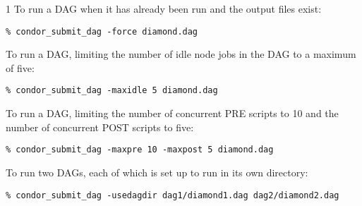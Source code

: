\begin{ManPage}{\label{man-condor-submit-dag}}{1}
To run a DAG when it has already been run and the output files exist:
\begin{verbatim}
% condor_submit_dag -force diamond.dag
\end{verbatim}

To run a DAG, limiting the number of idle node jobs in the DAG to a
maximum of five:
\begin{verbatim}
% condor_submit_dag -maxidle 5 diamond.dag
\end{verbatim}

To run a DAG, limiting the number of concurrent PRE scripts to 10
and the number of concurrent POST scripts to five:
\begin{verbatim}
% condor_submit_dag -maxpre 10 -maxpost 5 diamond.dag
\end{verbatim}

To run two DAGs, each of which is set up to run in its own directory:
\begin{verbatim}
% condor_submit_dag -usedagdir dag1/diamond1.dag dag2/diamond2.dag
\end{verbatim}

\end{ManPage}

